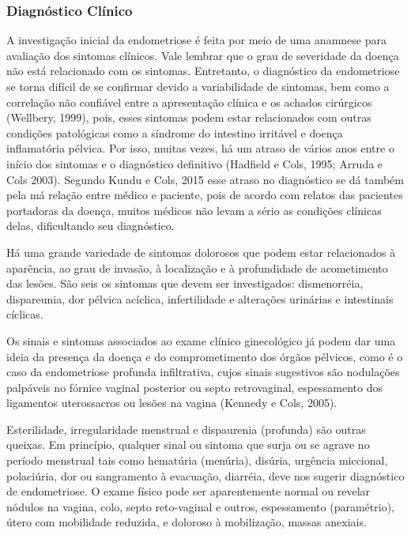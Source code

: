 \documentclass[12pt]{article} %
\begin{document}
\subsubsection{Diagnóstico Clínico}

A investigação inicial da endometriose é feita por meio de uma
anamnese para avaliação dos sintomas clínicos. Vale lembrar que o grau
de severidade da doença não está relacionado com os sintomas.
Entretanto, o diagnóstico da endometriose se torna difícil de se
confirmar devido a variabilidade de sintomas, bem como a correlação
não confiável entre a apresentação clínica e os achados cirúrgicos
(Wellbery, 1999), pois, esses sintomas podem estar relacionados com
outras condições patológicas como a síndrome do intestino irritável e
doença inflamatória pélvica. Por isso, muitas vezes, há um atraso de
vários anos entre o início dos sintomas e o diagnóstico definitivo
(Hadfield e Cols, 1995; Arruda e Cols 2003). Segundo Kundu e Cols,
2015 esse atraso no diagnóstico se dá também pela má relação entre
médico e paciente, pois de acordo com relatos das pacientes portadoras
da doença, muitos médicos não levam a sério as condições clínicas
delas, dificultando seu diagnóstico.

Há uma grande variedade de sintomas dolorosos que podem estar
relacionados à aparência, ao grau de invasão, à localização e à
profundidade de acometimento das lesões. São seis os sintomas que
devem ser investigados: dismenorréia, dispareunia, dor pélvica
acíclica, infertilidade e alterações urinárias e intestinais cíclicas.

Os sinais e sintomas associados ao exame clínico ginecológico já podem
dar uma ideia da presença da doença e do comprometimento dos órgãos
pélvicos, como é o caso da endometriose profunda infiltrativa, cujos
sinais sugestivos são nodulações palpáveis no fórnice vaginal
posterior ou septo retrovaginal, espessamento dos ligamentos
uterossacros ou lesões na vagina (Kennedy e Cols, 2005).

Esterilidade, irregularidade menstrual e dispaurenia (profunda) são
outras queixas. Em princípio, qualquer sinal ou sintoma que surja ou
se agrave no período menstrual tais como hematúria (menúria), disúria,
urgência miccional, polaciúria, dor ou sangramento à evacuação,
diarréia, deve nos sugerir diagnóstico de endometriose. O exame físico
pode ser aparentemente normal ou revelar nódulos na vagina, colo,
septo reto-vaginal e outros, espessamento (paramétrio), útero com
mobilidade reduzida, e doloroso à mobilização, massas anexiais.
\end{document}
